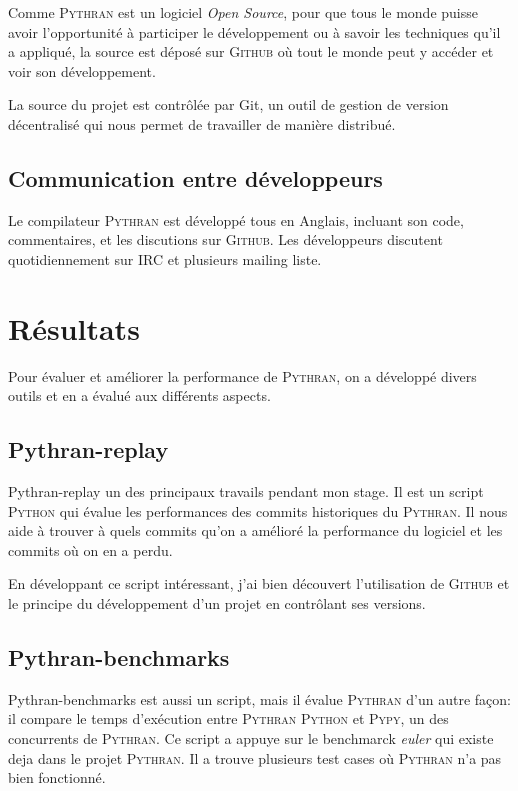 \documentclass[a4paper, 11pt]{article}
\newcommand\Pythran{\textsc{Pythran}}
\newcommand\Python{\textsc{Python}}
\newcommand\Pypy{\textsc{Pypy}}
\newcommand\Github{\textsc{Github}}
\begin{document}
Comme \Pythran{} est un logiciel \emph{Open Source}, pour que tous le monde puisse
avoir l'opportunité à participer le développement ou à savoir les techniques
qu'il a appliqué, la source est déposé sur \Github{} où tout le monde peut
y accéder et voir son développement.

La source du projet est contrôlée par Git, un outil de gestion de version
décentralisé qui nous permet de travailler de manière distribué.

\subsection*{Communication entre développeurs}

Le compilateur \Pythran{} est développé tous en Anglais, incluant son code,
commentaires, et les discutions sur \Github{}.
Les développeurs discutent quotidiennement sur IRC et plusieurs mailing liste.

\section{Résultats}
\label{sec:resultats}

Pour évaluer et améliorer la performance de \Pythran{}, on a développé
divers outils et en a évalué aux différents aspects.

\subsection*{Pythran-replay}

Pythran-replay un des principaux travails pendant mon stage. Il est un script
\Python{} qui évalue les performances des commits historiques du \Pythran{}.
Il nous aide à trouver à quels commits qu'on a amélioré la
performance du logiciel et les commits où on en a perdu.

En développant ce script intéressant, j'ai bien découvert l'utilisation de
\Github{} et le principe du développement d'un projet en contrôlant ses versions.

\subsection*{Pythran-benchmarks}

Pythran-benchmarks est aussi un script, mais il évalue \Pythran{} d'un autre
façon: il compare le temps d'exécution entre \Pythran{} \Python{} et \Pypy{},
un des concurrents de \Pythran{}. Ce script a appuye sur le benchmarck
\emph{euler} qui existe deja dans le projet \Pythran{}. Il a trouve plusieurs
test cases où \Pythran{} n'a pas bien fonctionné.
\end{document}
